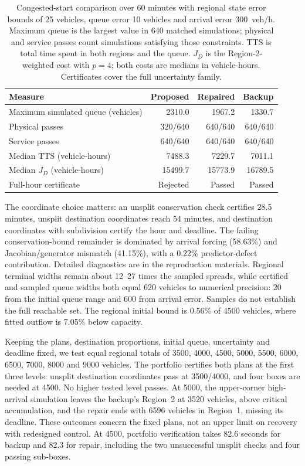 \documentclass[preprint,12pt]{elsarticle}
\theoremstyle{definition}
\theoremstyle{plain}
\theoremstyle{definition}
\theoremstyle{plain}
\begin{document}
\begin{table}[!htbp]
\centering\small
\caption{Congested-start comparison over 60 minutes with regional state
error bounds of 25 vehicles, queue error 10 vehicles and arrival error
300~veh/h. Maximum queue is the largest value in 640 matched simulations;
physical and service passes count simulations satisfying those constraints.
TTS is total time spent in both regions and the queue. $J_D$ is the
Region-2-weighted cost with $p=4$; both costs are medians in vehicle-hours.
Certificates cover the full uncertainty family.}
\label{tab:congested-results}
\begin{tabularx}{\linewidth}{@{}Xrrr@{}}
\toprule
Measure & Proposed & Repaired & Backup\\
\midrule
Maximum simulated queue (vehicles) & 2310.0 & 1967.2 & 1330.7\\
Physical passes & 320/640 & 640/640 & 640/640\\
Service passes & 640/640 & 640/640 & 640/640\\
Median TTS (vehicle-hours) & 7488.3 & 7229.7 & 7011.1\\
Median $J_D$ (vehicle-hours) & 15499.7 & 15773.9 & 16789.5\\
Full-hour certificate & Rejected & Passed & Passed\\
\bottomrule
\end{tabularx}
\end{table}

The coordinate choice matters: an unsplit conservation check certifies
28.5 minutes, unsplit destination coordinates reach 54 minutes, and
destination coordinates with subdivision certify the hour and deadline.
The failing conservation-bound remainder is dominated by arrival forcing
(58.63\%) and Jacobian/generator mismatch (41.15\%), with a 0.22\%
predictor-defect contribution. Detailed diagnostics are in the reproduction
materials. Regional terminal widths remain about 12--27 times the sampled
spreads, while certified and sampled queue widths both equal 620 vehicles
to numerical precision: 20 from the initial queue range and 600 from
arrival error. Samples do not establish the full reachable set. The
regional initial bound is 0.56\% of 4500 vehicles, where fitted outflow
is 7.05\% below capacity.

Keeping the plans, destination proportions, initial queue, uncertainty
and deadline fixed, we test equal regional totals of 3500, 4000, 4500,
5000, 5500, 6000, 6500, 7000, 8000 and 9000 vehicles. The portfolio
certifies both plans at the first three levels: unsplit destination
coordinates pass at 3500/4000, and four boxes are needed at 4500.
No higher tested level passes. At 5000, the upper-corner high-arrival
simulation leaves the backup's Region~2 at 3520 vehicles, above critical
accumulation, and the repair ends with 6596 vehicles in Region~1, missing
its deadline. These outcomes concern the fixed plans, not an upper limit
on recovery with redesigned control. At 4500, portfolio verification
takes 82.6 seconds for backup and 82.3 for repair, including the two
unsuccessful unsplit checks and four passing sub-boxes.
\end{document}

